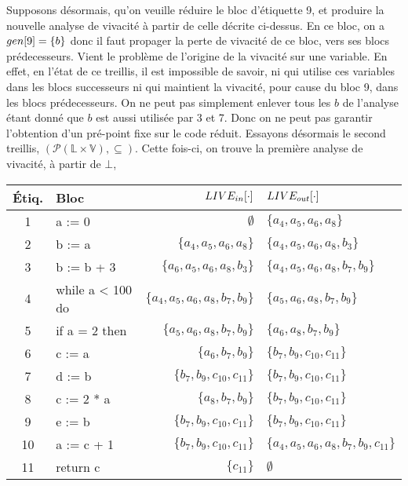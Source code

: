 \documentclass[a4paper, 10pt]{article}
\begin{document}
\begin{example}
\begin{center}
\begin{tabular}{||c|l|r|l||}
	\hline
	\end{tabular}
\end{center}
Supposons désormais, qu'on veuille réduire le bloc d'étiquette 9, et produire la nouvelle analyse de vivacité
à partir de celle décrite ci-dessus. En ce bloc, on a $gen[9] = \{b\}$ donc il faut propager la perte de vivacité
de ce bloc, vers ses blocs prédecesseurs. Vient le problème de l'origine de la vivacité sur une variable. En effet,
en l'état de ce treillis, il est impossible de savoir, ni qui utilise ces variables dans les blocs successeurs ni qui
maintient la vivacité, pour cause du bloc 9, dans les blocs prédecesseurs. On ne peut pas simplement enlever tous les $b$
de l'analyse étant donné que $b$ est aussi utilisée par 3 et 7. Donc on ne peut pas garantir l'obtention d'un
pré-point fixe sur le code réduit. Essayons désormais le second treillis, 
$(\mathcal{P}(\mathbb{L} \times \mathbb{V}), \subseteq)$. Cette fois-ci, on trouve la première analyse de vivacité, à partir
de $\bot$,
\begin{center}
	\begin{tabular}{||c|l|r|l||}
	\hline
	Étiq. & Bloc & $LIVE_{in}[\cdot]$ & $LIVE_{out}[\cdot]$ \\
	\hline
	1 & a := 0 & $\emptyset$ & $\{a_4, a_5, a_6, a_8\}$\\
	2 & b := a & $\{a_4, a_5, a_6, a_8\}$ & $\{a_4, a_5, a_6, a_8, b_3\}$\\
	3 & b := b + 3 & $\{a_6, a_5, a_6, a_8, b_3\}$ & $\{a_4, a_5, a_6, a_8, b_7, b_9\}$\\
	4 & while a < 100 do & $\{a_4, a_5, a_6, a_8, b_7, b_9\}$ & $\{a_5, a_6, a_8, b_7, b_9\}$\\
	5 & if a = 2 then & $\{a_5, a_6, a_8, b_7, b_9\}$ & $\{a_6, a_8, b_7, b_9\}$\\
	6 & c := a & $\{a_6, b_7, b_9\}$ & $\{b_7, b_9, c_{10}, c_{11}\}$\\
	7 & d := b & $\{b_7, b_9, c_{10}, c_{11}\}$ & $\{b_7, b_9, c_{10}, c_{11}\}$\\
	8 & c := 2 * a & $\{a_8, b_7, b_9\}$ & $\{b_7, b_9, c_{10}, c_{11}\}$\\
	9 & e := b & $\{b_7, b_9, c_{10}, c_{11}\}$ & $\{b_7, b_9, c_{10}, c_{11}\}$\\
	10 & a := c + 1 & $\{b_7, b_9, c_{10}, c_{11}\}$ & $\{a_4, a_5, a_6, a_8, b_7, b_9, c_{11}\}$\\
	11 & return c & $\{c_{11}\}$ & $\emptyset$\\
	\hline
	\end{tabular}
\end{center}

\end{example}
\end{document}
